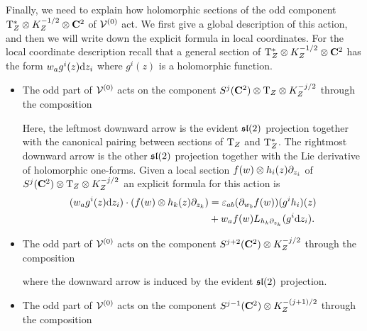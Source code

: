 Finally, we need to explain how holomorphic sections of the odd component ${\rm T}^*_Z \otimes K^{-1/2}_Z \otimes \mathbf{C}^2$ of $\mathcal V^{(0)}$ act.
We first give a global description of this action, and then we will write down the explicit formula in local coordinates.
For the local coordinate description recall that a general section of ${\rm T}^*_Z \otimes K^{-1/2}_Z \otimes \mathbf{C}^2$ has the form $w_a g^i(z) {\rm d} z_i$ where $g^i(z)$ is a holomorphic function. 
\begin{itemize}
\item The odd part of $\mathcal V^{(0)}$ acts on the component $S^{j}(\mathbf{C}^2) \otimes {\rm T}_Z \otimes K^{-j/2}_Z$ through the composition
\beqn
{}
\eeqn
Here, the leftmost downward arrow is the evident $\mathfrak{sl}(2)$ projection together with the canonical pairing between sections of ${\rm T}_Z$ and ${\rm T}^*_Z$.
The rightmost downward arrow is the other $\mathfrak{sl}(2)$ projection together with the Lie derivative of holomorphic one-forms.  
Given a local section $f(w) \otimes h_i(z) \partial_{z_i}$ of $S^j(\mathbf{C}^2) \otimes {\rm T}_Z \otimes K_Z^{-j/2}$ an explicit formula for this action is
\begin{align*}
(w_a g^i(z) {\rm d} z_i) \cdot (f(w) \otimes h_k(z) \partial_{z_k}) & = \varepsilon_{ab} (\partial_{w_b} f(w)) (g^i h_i)(z)  \\ & + w_a f(w) L_{h_k \partial_{z_k}} (g^i {\rm d} z_i) .
\end{align*}
\item The odd part of $\mathcal V^{(0)}$ acts on the component $S^{j+2}(\mathbf{C}^2) \otimes K^{-j/2}_Z$ through the composition
\beqn
{}
\eeqn
where the downward arrow is induced by the evident $\mathfrak{sl}(2)$ projection.
\item The odd part of $\mathcal V^{(0)}$ acts on the component $S^{j-1}(\mathbf{C}^2) \otimes K^{-(j+1)/2}_Z$ through the composition

\end{itemize}
